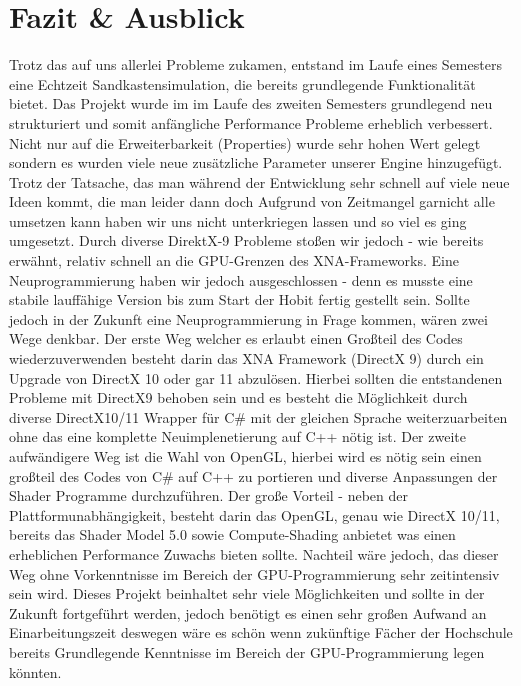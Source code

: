 \chapter{Fazit \& Ausblick}

\begin{Spacing}{\mylinespace}
Trotz das auf uns allerlei Probleme zukamen, entstand im Laufe eines Semesters eine Echtzeit Sandkastensimulation, die bereits grundlegende Funktionalität bietet. 
Das Projekt wurde im  im Laufe des zweiten Semesters grundlegend neu strukturiert und somit anfängliche Performance Probleme erheblich verbessert.
Nicht nur auf die Erweiterbarkeit (Properties) wurde sehr hohen Wert gelegt sondern es wurden viele neue zusätzliche Parameter unserer Engine hinzugefügt.
Trotz der Tatsache, das man während der Entwicklung sehr schnell auf viele neue Ideen kommt, die man leider dann doch Aufgrund von Zeitmangel garnicht alle umsetzen kann haben wir uns nicht unterkriegen lassen und so viel es ging umgesetzt. Durch diverse DirektX-9 Probleme stoßen wir jedoch - wie bereits erwähnt, relativ schnell an die GPU-Grenzen des XNA-Frameworks.
Eine Neuprogrammierung haben wir jedoch ausgeschlossen - denn es musste eine stabile lauffähige Version bis zum Start der Hobit fertig gestellt sein.
Sollte jedoch in der Zukunft eine Neuprogrammierung in Frage kommen, wären zwei Wege denkbar.
Der erste Weg welcher es erlaubt einen Großteil des Codes wiederzuverwenden besteht darin das XNA Framework (DirectX 9) durch ein Upgrade von DirectX 10 oder gar 11 abzulösen.
Hierbei sollten die entstandenen Probleme mit DirectX9 behoben sein und es besteht die Möglichkeit durch diverse DirectX10/11 Wrapper für C\# mit der gleichen Sprache weiterzuarbeiten ohne das eine komplette Neuimplenetierung auf C++ nötig ist.
Der zweite aufwändigere Weg ist die Wahl von OpenGL, hierbei wird es nötig sein einen großteil des Codes von C\# auf C++ zu portieren und diverse Anpassungen der Shader Programme durchzuführen. Der große Vorteil - neben der Plattformunabhängigkeit, besteht darin das OpenGL, genau wie DirectX 10/11, bereits das Shader Model 5.0 sowie Compute-Shading anbietet was einen erheblichen Performance Zuwachs bieten sollte. Nachteil wäre jedoch, das dieser Weg ohne Vorkenntnisse im Bereich der GPU-Programmierung sehr zeitintensiv sein wird.
Dieses Projekt beinhaltet sehr viele Möglichkeiten und sollte in der Zukunft fortgeführt werden, jedoch benötigt es einen sehr großen Aufwand an Einarbeitungszeit deswegen wäre es schön wenn zukünftige Fächer der Hochschule bereits Grundlegende Kenntnisse im Bereich der GPU-Programmierung legen könnten.
	
\end{Spacing}
\newpage
\clearpage
